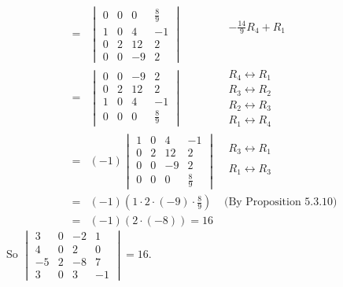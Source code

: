 \documentclass[12pt]{article}
\newenvironment{problem}[2][Problem]
{
	\begin{trivlist} 
		\item[\hskip \labelsep {\bfseries #1 #2:}]
	}
{
	\end{trivlist}
	}
\newenvironment{solution}[1][Solution]
{
	\begin{trivlist} 
		\item[\hskip \labelsep {\itshape #1:}]
	}
	{
	\end{trivlist}
}
\begin{document}
\begin{problem}{1}
\begin{solution}
\begin{align*}
%
=& \begin{vmatrix} 0&0&0&\frac{8}{9}\\1&0&4&-1\\0&2&12&2\\0&0&-9&2 \end{vmatrix} & \begin{matrix} -\frac{14}{9}R_4 +R_1\text{} \\ \text{} \\ \text{} \\ \text{} \end{matrix} \\
%
=& \begin{vmatrix} 0&0&-9&2\\0&2&12&2\\1&0&4&-1\\0&0&0&\frac{8}{9} \end{vmatrix} & \begin{matrix} R_4 \leftrightarrow R_1 \\ R_3 \leftrightarrow R_2 \text{} \\ R_2 \leftrightarrow R_3 \text{} \\ R_1 \leftrightarrow R_4 \text{} \end{matrix} \\
%
=& (-1)\begin{vmatrix} 1&0&4&-1\\0&2&12&2\\0&0&-9&2\\0&0&0&\frac{8}{9} \end{vmatrix} & \begin{matrix} R_3 \leftrightarrow R_1 \\  \text{} \\ R_1 \leftrightarrow R_3 \text{} \\ \text{} \end{matrix} \\
=& (-1)(1\cdot 2 \cdot (-9) \cdot \frac{8}{9}) & \text{(By Proposition 5.3.10)}\\
=&(-1)(2\cdot (-8)) = 16&
\end{align*}
So $\begin{vmatrix} 3&0&-2&1\\4&0&2&0\\-5&2&-8&7\\3&0&3&-1\end{vmatrix} = 16$.
\end{solution}
\end{problem}
\end{document}
